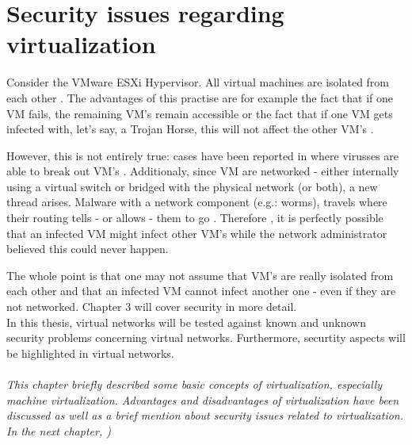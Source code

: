 \section{Security issues regarding virtualization}
\label{sec:securityRegardingVirtualization}
Consider the VMware ESXi Hypervisor. All virtual machines are isolated from each other \citep{Benefit4}. The advantages of this practise are for example the fact that if one VM fails, the remaining VM's remain accessible or the fact that if one VM gets infected with, let's say, a Trojan Horse, this will not affect the other VM's \citep{CompTia}.

However, this is not entirely true: cases have been reported in where virusses are able to break out VM's \citep{Crossover}. Additionaly, since VM are networked - either internally using a virtual switch or bridged with the physical network (or both), a new thread arises. Malware with a network component (e.g.: worms), travels where their routing tells - or allows - them to go \citep{Stackex}. Therefore , it is perfectly possible that an infected VM might infect other VM's while the network administrator believed this could never happen.

The whole point is that one may not assume that VM's are really isolated from each other and that an infected VM cannot infect another one - even if they are not networked. Chapter 3 will cover security in more detail.\\

In this thesis, virtual networks will be tested against known and unknown security problems concerning virtual networks. Furthermore, securtity aspects will be highlighted in virtual networks. \\ \\
\emph{This chapter briefly described some basic concepts of virtualization, especially machine virtualization. Advantages and disadvantages of virtualization have been discussed as well as a brief mention about security issues related to virtualization.\\
In the next chapter, )}